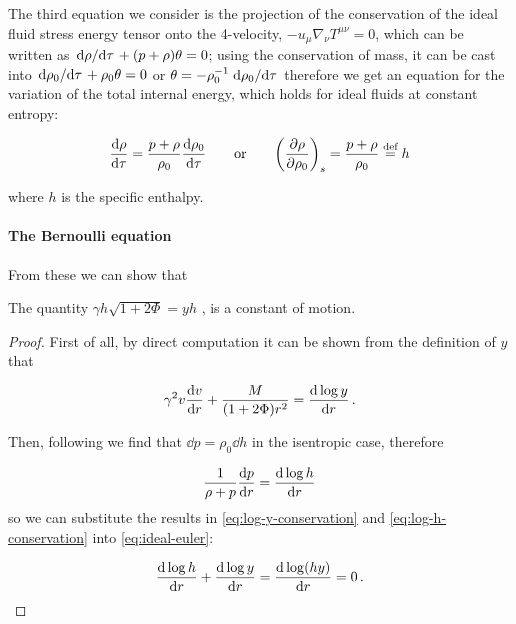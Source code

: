 \documentclass[main.tex]{subfiles}
\begin{document}
The third equation we consider is the projection of the conservation of the ideal fluid stress energy tensor onto the 4-velocity,
\(-u_\mu \nabla_\nu T^{\mu\nu}= 0 \),
which can be written as
\(\dv*{\rho}{\tau} + (p + \rho) \theta = 0 \);
using the conservation of mass, it can be cast into
\(\dv*{\rho_0}{\tau} + \rho_0 \theta = 0 \)
or
\(\theta = - \rho_0^{-1} \dv*{\rho_0}{\tau} \)
therefore we get an equation for the variation of the total internal energy, which holds for ideal fluids at constant entropy:

\begin{equation} \label{eq:enthalpy-definition}
    \dv{\rho}{\tau} = \frac{p+\rho}{\rho_0} \dv{\rho_0}{\tau}
    \qquad
    \text{or}
    \qquad
    \qty(\pdv{\rho}{\rho_0})_s = \frac{p + \rho}{\rho_0} \defeq h
\end{equation}

where $h$ is the specific enthalpy.

\paragraph{The Bernoulli equation}

From these we can show that

\begin{claim}
  The quantity $\gamma h \sqrt{1+2\Phi} = yh$ , is a constant of motion.
\end{claim}

\begin{proof}
First of all, by direct computation it can be shown from the definition of \(y\) that

\begin{equation} \label{eq:log-y-conservation}
  \gamma^2 v \dv{v}{r} + \frac{M}{(1+ 2 \Phi) r^2} = \dv{\log y }{r} \,.
\end{equation}

Then, following \textcite[section 6.3]{Gourgoulhon:2006bn} we find that \(\dd{p} = \rho_0 \dd{h}\) in the isentropic case, therefore

\begin{equation} \label{eq:log-h-conservation}
  \frac{1}{\rho + p} \dv{p}{r}  =  \dv{\log h}{r}
\end{equation}
so we can substitute the results in \eqref{eq:log-y-conservation} and \eqref{eq:log-h-conservation} into \eqref{eq:ideal-euler}:

\begin{equation}
  \dv{\log h}{r} + \dv{\log y }{r} = \dv{\log (hy) }{r} = 0 \,.
\end{equation}
\end{proof}
\end{document}

